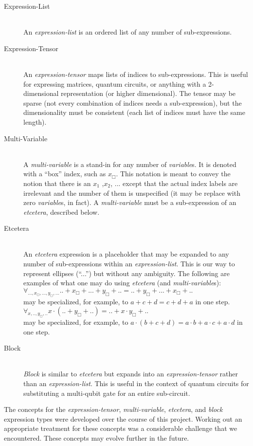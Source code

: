 \documentclass{article}[12pt]
\begin{document}
\begin{description}
\item[Expression-List] \hfill \\
  An {\em expression-list} is an ordered list of any number of sub-expressions.
\item[Expression-Tensor] \hfill \\
  An {\em expression-tensor} maps lists of indices to sub-expressions.  This is useful for expressing matrices, quantum circuits, or anything with a 2-dimensional representation (or higher dimensional).  The tensor may be sparse (not every combination of indices needs a sub-expression), but the dimensionality must be consistent (each list of indices must have the same length).
\item[Multi-Variable] \hfill \\
  A {\em multi-variable} is a stand-in for any number of {\em variable}s.  It is denoted with a “box” index, such as
  $x_{\Box}$.  This notation is meant to convey the notion that there is an $x_1$ ,$x_2$, ... except that the actual index labels are irrelevant and the number of them is unspecified (it may be replace with zero {\em variable}s, in fact).  A {\em multi-variable} must be a sub-expression of an {\em etcetera}, described below.
\item[Etcetera] \hfill \\  An {\em etcetera} expression is a placeholder that may be expanded to any number of sub-expressions within an {\em expression-list}.  This is our way to represent ellipses (“...”) but without any ambiguity.  The following are examples of what one may do using {\em etcetera} (and {\em multi-variable}s): \hfill \\
  $\forall_{...,x_{\Box},...,y_{\Box},...} .. + x_{\Box} + ... + y_{\Box}  + .. = .. + y_{\Box} + ... + x_{\Box}  + ..$ \hfill \\
  may be specialized, for example, to $a+c+d=c+d+a$ in one step. \hfill \\
  $\forall_{x,..,y_{\Box},..} x \cdot (.. + y_{\Box} + ..) = .. + x \cdot y_{\Box} + ..$ \hfill \\
may be specialized, for example, to $a \cdot (b+c+d)= a \cdot b + a \cdot c + a \cdot d$ in one step.
\item[Block] \hfill \\
{\em Block} is similar to {\em etcetera} but expands into an {\em expression-tensor} rather than an {\em expression-list}.  This is useful in the context of quantum circuits for substituting a multi-qubit gate for an entire sub-circuit.
\end{description}
The concepts for the {\em expression-tensor}, {\em multi-variable}, {\em etcetera}, and {\em block} expression types were developed over the course of this project.  Working out an appropriate treatment for these concepts was a considerable challenge that we encountered.  These concepts may evolve further in the future.
\end{document}
